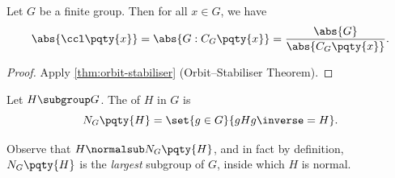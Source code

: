 \begin{proposition}
    \label{prop:size-conjugacy-class}%
    Let \(G\) be a finite group. Then for all \(x \in G\), we have
    \[
        \abs{\ccl\pqty{x}} = \abs{G : C_G\pqty{x}} = \frac{\abs{G}}{\abs{C_G\pqty{x}}}.
    \]
\end{proposition}

\begin{proof}
    Apply \autoref{thm:orbit-stabiliser} (Orbit--Stabiliser Theorem).
\end{proof}

\begin{definition}[Normaliser]
    \label{def:normaliser}%
    Let \(H \subgroup G\). The  of \(H\) in \(G\) is
    \[
        N_G \pqty{H} = \set{g \in G}{gHg\inverse = H}.
    \]
\end{definition}

Observe that \(H \normalsub N_G\pqty{H}\), and in fact by definition, \(N_G\pqty{H}\) is the \emph{largest} subgroup of \(G\), inside which \(H\) is normal.